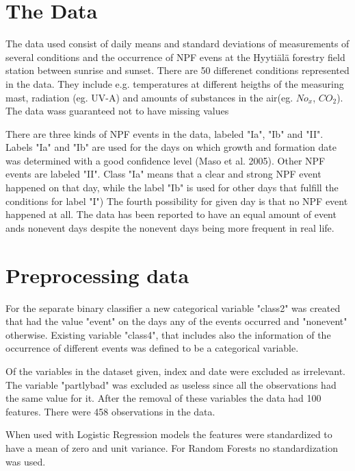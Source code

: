 \documentclass[a4size, 12pt]{report}
\begin{document}
	
	\section*{The Data}
	
	The data used consist of daily means and standard deviations of measurements of several conditions and the occurrence of NPF evens at the Hyytiälä forestry field station between sunrise and sunset. 	 There are 50 differenet conditions represented in the data. They include e.g. temperatures at different heigths of the measuring mast, radiation (eg. UV-A) and amounts of substances in the air(eg. $No_x$, $CO_2$). The data wass guaranteed not to have missing values 
	
	 There are three kinds of NPF events in the data, labeled "Ia", "Ib" and "II". Labels "Ia" and "Ib" are used for the days on which growth and formation date was determined with a good confidence level (Maso et al. 2005). Other NPF events are labeled "II". Class "Ia" means that a clear and strong NPF event happened on that day, while the label "Ib" is used for other days that fulfill the conditions for label "I")  The fourth possibility for given day is that no NPF event happened at all. The data has been reported to have an equal amount of event ands nonevent days despite the nonevent days being more frequent in real life. 
	 

	
 
	
	\section*{Preprocessing data}
	
		For the separate binary classifier a new categorical variable "class2" was created that had the value "event" on the days any of the events occurred and "nonevent" otherwise. Existing variable "class4", that includes also the information of the occurrence of different events was defined to be a categorical variable. 
		
		Of the variables in the dataset given, index and date were excluded as irrelevant. The variable "partlybad" was excluded as useless since all the observations had the same value for it. After the removal of these variables the data had 100 features. There were 458 observations in the data. 
		 
		When used with Logistic Regression models the features were standardized to have a mean of zero and unit variance. For Random Forests no standardization was used.  
\end{document}
